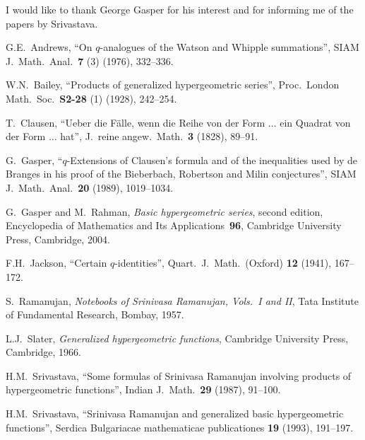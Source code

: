 I would like to thank George Gasper for his interest and for
informing me of the papers \cite{S1,S2} by  Srivastava.

\begin{thebibliography}{99}

 G.E.\ Andrews,
``On $q$-analogues of the Watson and Whipple summations'',
SIAM J.\ Math.\ Anal.\ \textbf{7} (3) (1976), 332--336.

 W.N.~Bailey,
``Products of generalized hypergeometric series'',
Proc.\ London Math.\ Soc.\ \textbf{S2-28} (1) (1928), 242--254.

 T.\ Clausen, 
``Ueber die F\"alle, wenn die Reihe von der Form $\ldots$ ein Quadrat
von der Form $\ldots$ hat'',
J.\ reine angew.\ Math.\ \textbf{3} (1828), 89--91.

 G.~Gasper,
``$q$-Extensions of Clausen's formula and of the inequalities used by
de Branges in his proof of the Bieberbach, Robertson and Milin conjectures'',
SIAM J.\ Math.\ Anal.\ \textbf{20} (1989), 1019--1034.

 G.~Gasper and M.~Rahman,
{\em Basic hypergeometric series}, second edition,
Encyclopedia of Mathematics and Its Applications~\textbf{96},
Cambridge University Press, Cambridge, 2004.

 F.H.~Jackson,
``Certain $q$-identities'',
Quart.\ J.\ Math.\ (Oxford) \textbf{12} (1941), 167--172.

 S.~Ramanujan,
{\em Notebooks of Srinivasa Ramanujan, Vols.\ I and II},
Tata Institute of Fundamental Research, Bombay, 1957.

 L.J.~Slater,
{\em Generalized hypergeometric functions}, Cambridge University Press,
Cambridge, 1966.

 H.M.~Srivastava,
``Some formulas of Srinivasa Ramanujan involving products of
hypergeometric functions'',
Indian J.\ Math.\ \textbf{29} (1987), 91--100.

 H.M.~Srivastava,
``Srinivasa Ramanujan and generalized basic hypergeometric functions'',
Serdica Bulgariacae mathematicae publicationes \textbf{19} (1993), 191--197.

\end{thebibliography}



